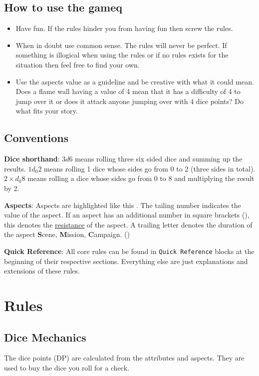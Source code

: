 \documentclass[11pt]{article}
\begin{document}
{\subsection{How to use the gameq}
\label{sec:org288d488}


\begin{itemize}
\item Have fun. If the rules hinder you from having fun then screw the rules.
\item When in doubt use common sense. The rules will never be perfect. If something is illogical when using the rules or if no rules exists for the situation then feel free to find your own.
\item Use the aspects value as a guideline and be creative with what it could mean. Does a flame wall having a value of 4 mean that it has a difficulty of 4 to jump over it or does it attack anyone jumping over with 4 dice points? Do what fits your story.
\end{itemize}
\subsection{Conventions}
\label{sec:orgce72de5}
\textbf{Dice shorthand}: \(3 d 6\) means rolling three six sided dice and summing up the results. \(1 d_0 2\) means rolling 1 dice whose sides go from 0 to 2 (three sides in total). \(2 \times d_0 8\) means rolling a dice whose sides go from 0 to 8 and multiplying the result by 2.

\textbf{Aspects}: Aspects are highlighted like this . The tailing number indicates the value of the aspect. If an aspect has an additional number in square brackets (), this denotes the \hyperref[sec:org647b490]{resistance} of the aspect. A trailing letter denotes the duration of the aspect \textbf{S}cene, \textbf{M}ission, \textbf{C}ampaign. ()

\textbf{Quick Reference}: All core rules can be found in \texttt{Quick Reference} blocks at the beginning of their respective sections. Everything else are just explanations and extensions of these rules.
\section{Rules}
\label{sec:orgdb43cc9}

\subsection{Dice Mechanics}
\label{sec:org2ebde8f}
\begin{short}
The dice points (DP) are calculated from the attributes and aspects. They are used to buy the dice you roll for a check.


\end{short}}
\end{document}
